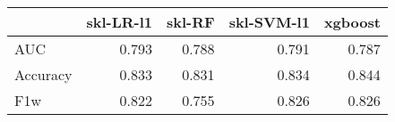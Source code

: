 \begin{tabular}{lrrrr}
\toprule
{} &  skl-LR-l1 &  skl-RF &  skl-SVM-l1 &  xgboost \\
\midrule
AUC      &      0.793 &   0.788 &       0.791 &    0.787 \\
Accuracy &      0.833 &   0.831 &       0.834 &    0.844 \\
F1w      &      0.822 &   0.755 &       0.826 &    0.826 \\
\bottomrule
\end{tabular}
